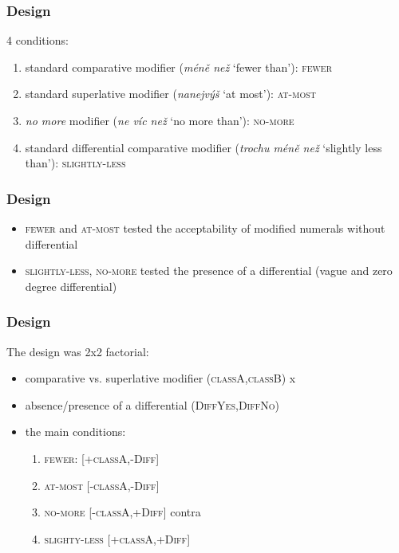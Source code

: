 \documentclass[10pt
]{beamer}
\newcommand{\cond}[1]{\textsc{#1}}
\begin{document}
\begin{frame}
  \frametitle{Design}

4 conditions:

\begin{enumerate}
  \item standard comparative modifier (\textit{méně než} `fewer than'): \cond{fewer}
  \item standard superlative modifier (\textit{nanejvýš} `at most'):  \cond{at-most}
  \item \textit{no more} modifier (\textit{ne víc než} `no more than'): \cond{no-more}
  \item standard differential comparative modifier (\textit{trochu méně než} `slightly less than'): \cond{slightly-less}
\end{enumerate}

\end{frame}

\begin{frame}
  \frametitle{Design}

  \begin{itemize}
    \item \cond{fewer} and \cond{at-most} tested the acceptability of modified numerals without differential
    \item \cond{slightly-less}, \cond{no-more} tested the presence of a differential (vague and zero degree differential)
  \end{itemize}
  
\end{frame}

\begin{frame}
  \frametitle{Design}

  The design was 2x2 factorial: 
  
  \begin{itemize}
    \item comparative vs. superlative modifier (\cond{classA},\cond{classB}) x 
    \item absence/presence of a differential (\cond{DiffYes},\cond{DiffNo})
    \item the main conditions:
    \begin{enumerate}
      \item \cond{fewer}: [+\cond{classA},-\cond{Diff}]
      \item \cond{at-most} [-\cond{classA},-\cond{Diff}]
      \item \cond{no-more} [-\cond{classA},+\cond{Diff}] \hfill contra \cite{nouwen2008upper}
      \item \cond{slighty-less} [+\cond{classA},+\cond{Diff}]
    \end{enumerate}
  \end{itemize}
  
\end{frame}
\end{document}

